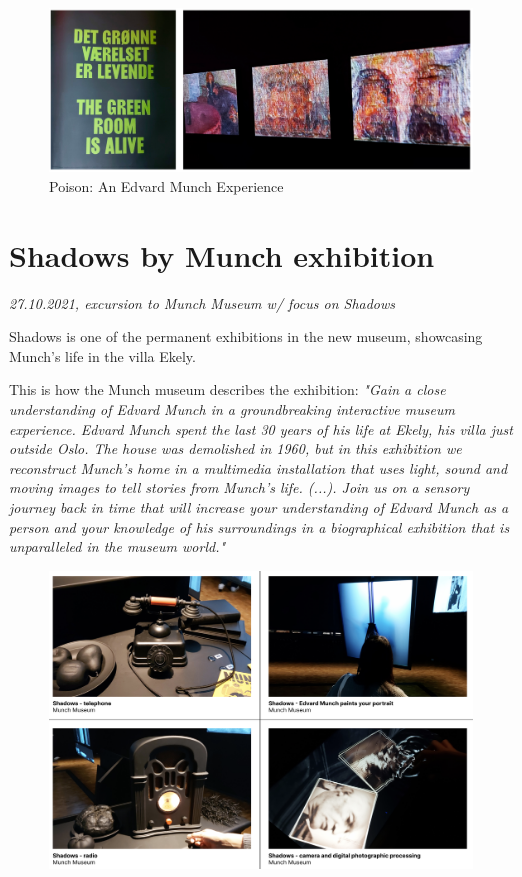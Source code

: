 \begin{figure}[H]
\includegraphics[width=12.5cm]{pictures/process/poison_alive.png}
\caption{Poison: An Edvard Munch Experience}
\centering 
\end{figure}


\section{Shadows by Munch exhibition}
\par
\emph{27.10.2021, excursion to Munch Museum w/ focus on Shadows}
\par

Shadows is one of the permanent exhibitions in the new museum, showcasing Munch's life in the villa Ekely.

This is how the Munch museum describes the exhibition: \emph{"Gain a close understanding of Edvard Munch in a groundbreaking interactive museum experience.
Edvard Munch spent the last 30 years of his life at Ekely, his villa just outside Oslo. The house was demolished in 1960, but in this exhibition we reconstruct Munch’s home in a multimedia installation that uses light, sound and moving images to tell stories from Munch’s life. (...). Join us on a sensory journey back in time that will increase your understanding of Edvard Munch as a person and your knowledge of his surroundings in a biographical exhibition that is unparalleled in the museum world."}


\begin{figure}[H]
\includegraphics[width=12cm]{pictures/dataset/munch_1.png}
\centering 
\end{figure}


